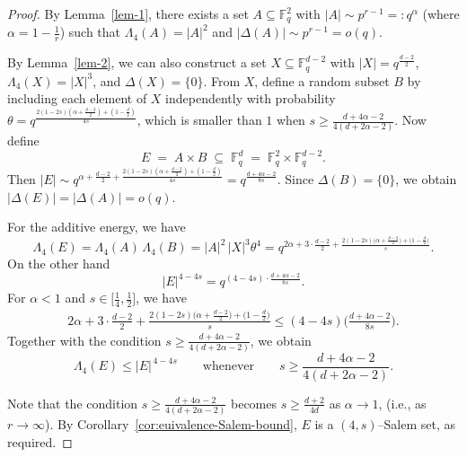 \documentclass[11pt]{article}
\begin{document}
\begin{proof}
By Lemma~\ref{lem-1},  there exists a set $A \subseteq \mathbb{F}_q^2$ with $|A| \sim p^{r-1} =: q^\alpha$ (where $\alpha = 1 - \frac{1}{r}$) such that $\Lambda_4(A) = |A|^2$ and $|\Delta(A)| \sim p^{r-1} = o(q)$.

By Lemma~\ref{lem-2}, we can also construct a set $X \subseteq \mathbb{F}_q^{d-2}$ with $|X|= q^{\frac{d-2}{2}}$, $\Lambda_4(X)= |X|^3$, and $\Delta(X) = \{0\}$. From $X$, define a random subset $B$ by including each element of $X$ independently with probability $\theta=q^{\frac{2(1-2s)(\alpha+\frac{d-2}{2})+(1-\frac{d}{2})}{4s}}$, which is smaller than $1$ when $s\ge \frac{d+4\alpha-2}{4(d+2\alpha-2)}$.
Now define
	\[
	E \;=\; A \times B 
	\;\subseteq\; \mathbb{F}_{q}^{d}
	\;=\; \mathbb{F}_{q}^{2} \times \mathbb{F}_{q}^{d-2}.
	\]
Then $|E|\sim q^{\alpha + \frac{d-2}{2} + \frac{2(1-2s)(\alpha + \frac{d-2}{2}) + (1 - \frac{d}{2})}{4s}} =q^{\frac{d+4\alpha-2}{8s}}$. Since $\Delta(B) = \{0\}$, we obtain $|\Delta(E)| = |\Delta(A)| = o(q)$. 

	For the additive energy, we have
	\[
	\Lambda_4(E) 
	= \Lambda_4(A)\,\Lambda_4(B) 
	= |A|^2 \, |X|^3 \theta^4=q^{2\alpha+3 \cdot \frac{d-2}{2}+\frac{2(1-2s)\big(\alpha+\frac{d-2}{2}\big)+\big(1-\frac{d}{2}\big)}{s}}.
	\]
    On the other hand 
    \[ |E|^{4-4s}=q^{(4-4s) \cdot \frac{d+4\alpha-2}{8s}}.  \]
    For $\alpha<1$ and $s \in \big[\frac{1}{4}, \frac{1}{2} \big]$, we have
    \begin{align*}
        2\alpha+3 \cdot \frac{d-2}{2}+\frac{2(1-2s)\big(\alpha+\frac{d-2}{2}\big)+\big(1-\frac{d}{2}\big)}{s} \leq (4-4s) \bigg(\frac{d+4\alpha-2}{8s} \bigg).
    \end{align*}
    Together with the condition $s\ge \frac{d+4\alpha-2}{4(d+2\alpha-2)}$, 
    we obtain
    \[
        \Lambda_4(E)\le |E|^{\,4-4s}
        \qquad\text{whenever}\qquad
    s\ge \frac{d+4\alpha-2}{4(d+2\alpha-2)}.
    \]
    
Note that the condition $s\ge \frac{d+4\alpha-2}{4(d+2\alpha-2)}$  becomes $s\ge \frac{d+2}{4d}$ as $\alpha\to 1$,  (i.e., as $r \to \infty$). By Corollary~\ref{cor:euivalence-Salem-bound}, $E$ is a $(4,s)$--Salem set, as required.
	\end{proof}
\end{document}
